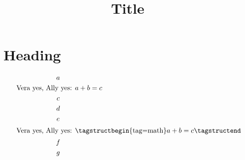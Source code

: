 \documentclass{article}
\title{Title}
\author{}
\date{}
\begin{document}
\section*{Heading}
\begin{gather*}
a\\
     \text{ Vera yes, Ally yes: }a+b=c\\  %
c\\
d\\
e\\
\intertext{ Vera yes, Ally yes: \tagstructbegin{tag=math}\(a+b=c\)\tagstructend}
f\\
g
\end{gather*}
\end{document}
